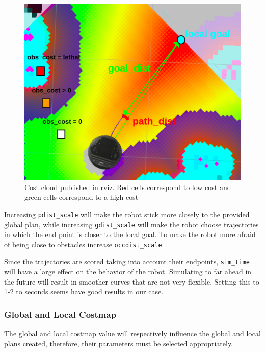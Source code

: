\documentclass[12pt]{article}
\begin{document}
\begin{figure}[!htb]
    \centering
    \includegraphics[scale=0.3]{cost_cloud.png}
    \caption{Cost cloud published in rviz. Red cells correspond to low cost and green cells correspond to a high cost}
    \label{fig:cost_cloud}
\end{figure}


Increasing \texttt{pdist\_scale} will make the robot stick more closely to the provided global plan, while increasing \texttt{gdist\_scale} will make the robot choose trajectories in which the end point is closer to the local goal. To make the robot more afraid of being close to obstacles increase \texttt{occdist\_scale}.

Since the trajectories are scored taking into account their endpoints, \texttt{sim\_time} will have a large effect on the behavior of the robot. Simulating to far ahead in the future  will result in smoother curves that are not very flexible. Setting this to 1-2 to seconds seems have good results in our case.

\subsubsection{Global and Local Costmap }
The global and local costmap value will respectively influence the global and local plans created, therefore, their parameters must be selected appropriately.
\end{document}

